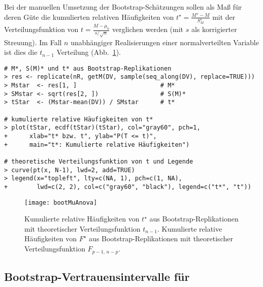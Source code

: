 Bei der manuellen Umsetzung der Bootstrap-Schätzungen sollen als Maß für deren Güte die kumulierten relativen Häufigkeiten von $t^{\star} = \frac{M^{\star}-M}{S_{M}^{\star}}$ mit der Verteilungsfunktion von $t = \frac{M - \mu_{0}}{s / \sqrt{n}}$ verglichen werden (mit $s$ als korrigierter Streuung). Im Fall $n$ unabhängiger Realisierungen einer normalverteilten Variable ist dies die $t_{n-1}$ Verteilung (Abb.\ \ref{fig:bootstrap}).
\begin{lstlisting}
# M*, S(M)* und t* aus Bootstrap-Replikationen
> res <- replicate(nR, getM(DV, sample(seq_along(DV), replace=TRUE)))
> Mstar  <- res[1, ]                       # M*
> SMstar <- sqrt(res[2, ])                 # S(M)*
> tStar  <- (Mstar-mean(DV)) / SMstar      # t*

# kumulierte relative Häufigkeiten von t*
> plot(tStar, ecdf(tStar)(tStar), col="gray60", pch=1,
+      xlab="t* bzw. t", ylab="P(T <= t)",
+      main="t*: Kumulierte relative Häufigkeiten")

# theoretische Verteilungsfunktion von t und Legende
> curve(pt(x, N-1), lwd=2, add=TRUE)
> legend(x="topleft", lty=c(NA, 1), pch=c(1, NA),
+        lwd=c(2, 2), col=c("gray60", "black"), legend=c("t*", "t"))
\end{lstlisting}

\begin{figure}[ht]
\centering
\texttt{[image: bootMuAnova]}
\vspace*{-0.5em}
\caption{Kumulierte relative Häufigkeiten von $t^{\star}$ aus Bootstrap-Replikationen mit theoretischer Verteilungsfunktion $t_{n-1}$. Kumulierte relative Häufigkeiten von $F^{\star}$ aus Bootstrap-Replikationen mit theoretischer Verteilungsfunktion $F_{p-1,\, n-p}$.}
\label{fig:bootstrap}
\end{figure}

\subsection[Bootstrap-Vertrauensintervalle für \texorpdfstring{$\mu_{2}-\mu_{1}$}{mu2-mu1}]{Bootstrap-Vertrauensintervalle für }
\label{sec:bootTwoInd}

